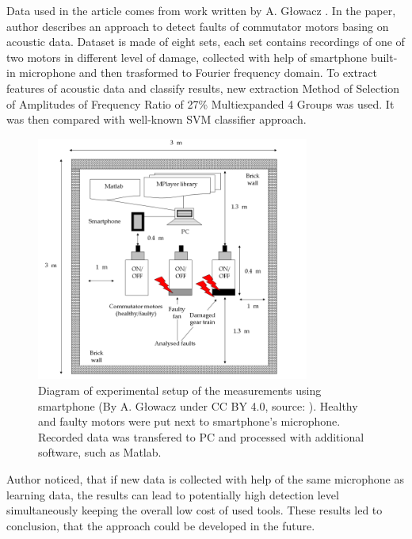 \documentclass[energies,article,submit,pdftex,moreauthors]{Definitions/mdpi}
\begin{document}
Data used in the article comes from work written by A. Głowacz \cite{ref-motors}. In the paper, author describes an approach to detect faults of commutator motors basing on acoustic data. Dataset is made of eight sets, each set contains recordings of one of two motors in different level of damage, collected with help of smartphone built-in microphone and then trasformed to Fourier frequency domain. To extract features of acoustic data and classify results, new extraction Method of Selection of Amplitudes of Frequency Ratio of 27\% Multiexpanded 4 Groups was used. It was then compared with well-known SVM classifier approach. 

\vspace{5mm}
\begin{figure}[H]
\centering
\includegraphics[width=0.8\textwidth]{images/drill-setup-diagram}
\caption{Diagram of experimental setup of the measurements using smartphone (By A. Głowacz under CC BY 4.0, source: \cite{ref-motors}). Healthy and faulty motors were put next to smartphone's microphone. Recorded data was transfered to PC and processed with additional software, such as Matlab.}
\end{figure}
\unskip
\vspace{5mm}

Author noticed, that if new data is collected with help of the same microphone as learning data, the results can lead to potentially high detection level simultaneously keeping the overall low cost of used tools. These results led to conclusion, that the approach could be developed in the future.
\end{document}

